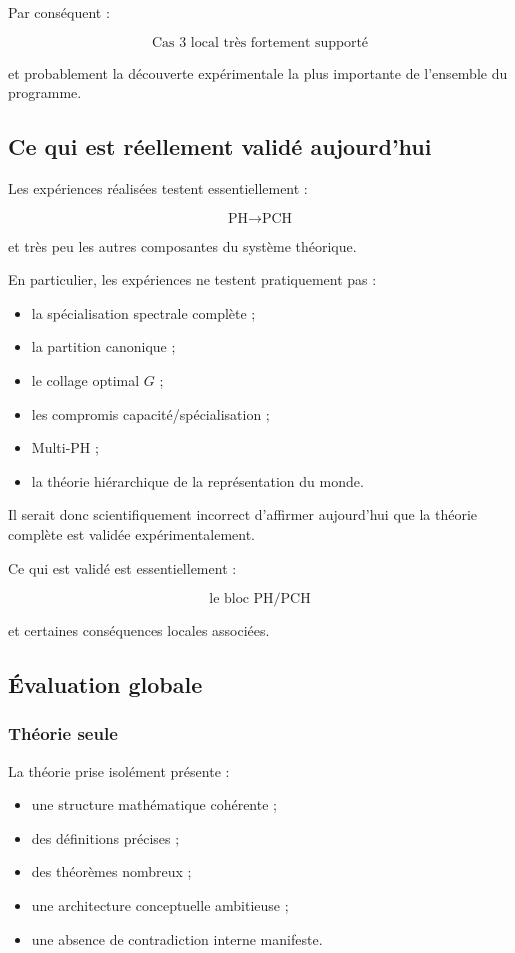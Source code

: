 Par conséquent :

\[
\boxed{
\text{Cas 3 local très fortement supporté}
}
\]

et probablement la découverte expérimentale la plus importante de l'ensemble du programme.

\subsection{Ce qui est réellement validé aujourd'hui}

Les expériences réalisées testent essentiellement :

\[
\boxed{
\text{PH}
\longrightarrow
\text{PCH}
}
\]

et très peu les autres composantes du système théorique.

En particulier, les expériences ne testent pratiquement pas :

\begin{itemize}
    \item la spécialisation spectrale complète ;
    \item la partition canonique ;
    \item le collage optimal \(G\) ;
    \item les compromis capacité/spécialisation ;
    \item Multi-PH ;
    \item la théorie hiérarchique de la représentation du monde.
\end{itemize}

Il serait donc scientifiquement incorrect d'affirmer aujourd'hui que la théorie complète est validée expérimentalement.

Ce qui est validé est essentiellement :

\[
\boxed{
\text{le bloc PH/PCH}
}
\]

et certaines conséquences locales associées.

\subsection{Évaluation globale}

\subsubsection{Théorie seule}

La théorie prise isolément présente :

\begin{itemize}
    \item une structure mathématique cohérente ;
    \item des définitions précises ;
    \item des théorèmes nombreux ;
    \item une architecture conceptuelle ambitieuse ;
    \item une absence de contradiction interne manifeste.
\end{itemize}

